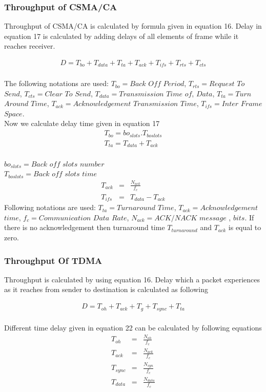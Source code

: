 \documentclass[10pt, conference, compsocconf]{IEEEtran}
\begin{document}
\subsubsection{Throughput of CSMA/CA}

Throughput of CSMA/CA is calculated by formula given in equation 16. Delay in equation 17 is calculated by adding delays of all elements of frame while it reaches receiver.

\begin{eqnarray}
D=T_{bo}+T_{data}+T_{ta}+T_{ack}+T_{ifs}+T_{rts}+T_{cts}
\end{eqnarray}
\\
The following notations are used: $T_{bo}=Back$ $Off$ $Period$, $T_{rts}=Request$ $To$ $Send$, $T_{cts}=Clear$ $To$ $Send$, $T_{data}=Transmission$ $Time$ $of$, $Data$, $T_{ta}=Turn$ $Around$ $Time$, $T_{ack}=Acknowledgement$ $Transmission$ $Time$, $T_{ifs}=Inter$ $Frame$ $Space$. \\
Now we calculate delay time given in equation 17
\begin{eqnarray}
T_{bo}=bo_{slots}.T_{boslots}
\\
T_{ta}=T_{data} + T_{ack}
\end{eqnarray}
\\
$bo_{slots}=Back$ $off$ $slots$ $number$
\\
$T_{boslots}=Back$ $off$ $slots$ $time$
\\
\begin{eqnarray}
T_{ack}&=&\frac{N_{ack}}{f_{c}}
\\
T_{ifs}&=&T_{data}-T_{ack}
\end{eqnarray}
Following notations are used: $T_{ta}=Turnaround$ $Time$, $T_{ack}=Acknowledgement$ $time$, $f_{c}= Communication$ $Data$ $Rate$, $N_{ack}=ACK/NACK$ $message$ , $bits$.
\indent If there is no acknowledgement then turnaround time $T_{turnaround}$ and $T_{ack}$ is equal to zero.
\\
\subsubsection{Throughput Of TDMA}

Throughput is calculated by using equation 16. Delay which a packet experiences as it reaches from sender to destination is calculated as following

\begin{eqnarray}
D=T_{oh}+T_{ack}+T_{g}+T_{sync}+T_{ta}
\end{eqnarray}
\\
Different time delay given in equation 22 can be calculated by following equations
\\
\begin{eqnarray}
T_{oh} & =&\frac{N_{oh}}{f_{c}}
\\
T_{ack}&=&\frac{N_{ack}}{f_{c}}
\\
T_{sync}&=&\frac{N_{syn}}{f_{c}}
\\
T_{data}&=&\frac{N_{data}}{f_{c}}
\end{eqnarray}
\end{document}
